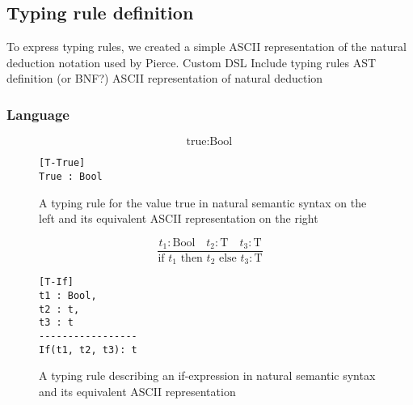 \documentclass[nofilelist]{cslthse-msc}
\begin{document}
\subsection{Typing rule definition}\label{typingruledefinition}
To express typing rules, we created a simple ASCII representation of the natural deduction notation used by Pierce\cite{Pierce}.
Custom DSL
Include typing rules AST definition (or BNF?)
ASCII representation of natural deduction %
\subsubsection{Language}

\begin{figure}[h]
\centering
\begin{minipage}{.45\textwidth}
  \centering
  \begin{equation}
    \tag{T-True}
    \text{true} : \text{Bool}
  \end{equation}
\end{minipage}%
\hspace{.1\textwidth}\begin{minipage}{.45\textwidth}
  \centering
\begin{lstlisting}[]
[T-True]
True : Bool
\end{lstlisting}
\end{minipage}
\caption{A typing rule for the value true in natural semantic syntax on the left and its equivalent ASCII representation on the right}
\label{trexampletrue}
\end{figure}
\begin{figure}[h]
\centering
\begin{minipage}{.45\textwidth}
  \centering
  \begin{equation}
    \tag{T-If}
    \frac{
      t_1 : \text{Bool}\quad
      t_2 : \text{T}\quad
      t_3 : \text{T}
    }{
      \text{if } t_1 \text{ then } t_2 \text{ else } t_3 : \text{T}
    }
  \end{equation}
\end{minipage}%
\hspace{.1\textwidth}\begin{minipage}{.45\textwidth}
  \centering
\begin{lstlisting}[]
[T-If]
t1 : Bool,
t2 : t,
t3 : t
-----------------
If(t1, t2, t3): t
\end{lstlisting}
\end{minipage}
\caption{A typing rule describing an if-expression in natural semantic syntax and its equivalent ASCII representation}
\label{trexampleif}
\end{figure}
\end{document}
